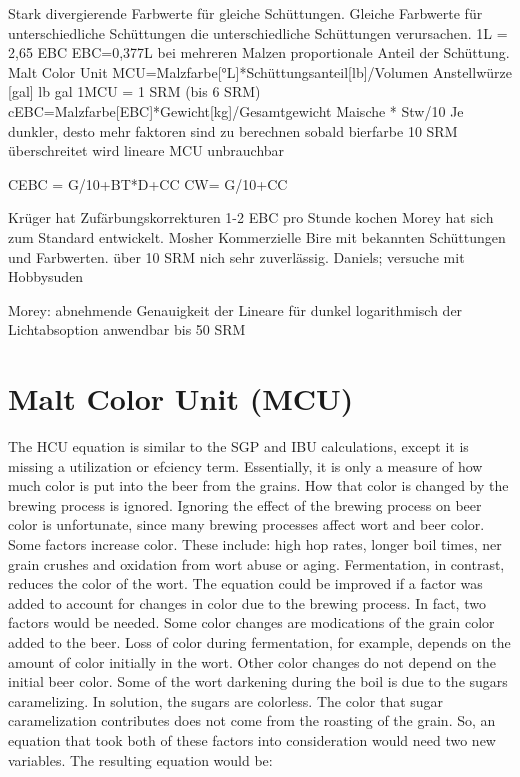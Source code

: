 \documentclass[a4paper,parskip=half]{scrartcl}
\begin{document}
\parencite{KrausWeyermann2021b}
Stark divergierende Farbwerte für gleiche Schüttungen.
Gleiche Farbwerte für unterschiedliche Schüttungen die 
unterschiedliche Schüttungen verursachen.
1L = 2,65 EBC
EBC=0,377L
bei mehreren Malzen proportionale Anteil der Schüttung.
Malt Color Unit MCU=Malzfarbe[°L]*Schüttungsanteil[lb]/Volumen Anstellwürze [gal]
lb gal 
1MCU = 1 SRM (bis 6 SRM)
cEBC=Malzfarbe[EBC]*Gewicht[kg]/Gesamtgewicht Maische * Stw/10 
Je dunkler, desto mehr faktoren sind zu berechnen
sobald bierfarbe 10 SRM überschreitet wird lineare MCU unbrauchbar

CEBC = G/10+BT*D+CC
CW= G/10+CC

Krüger hat Zufärbungskorrekturen
1-2 EBC pro Stunde kochen
Morey hat sich zum Standard entwickelt.
Mosher Kommerzielle Bire mit bekannten Schüttungen und Farbwerten. über 10 SRM nich sehr zuverlässig.
Daniels; versuche mit Hobbysuden

Morey: abnehmende Genauigkeit der Lineare für dunkel logarithmisch der Lichtabsoption
anwendbar bis 50 SRM

\section*{Malt Color Unit (MCU)}

\parencite{Colby2000}
The HCU equation is similar to the SGP and IBU calculations, except it is missing a utilization or efciency term.
Essentially, it is only a measure of how much color is put into the beer from the grains. How that color is
changed by the brewing process is ignored.
Ignoring the effect of the brewing process on beer color is unfortunate, since many brewing processes affect
wort and beer color. Some factors increase color. These include: high hop rates, longer boil times, ner grain
crushes and oxidation from wort abuse or aging. Fermentation, in contrast, reduces the color of the wort.
The equation could be improved if a factor was added to account for changes in color due to the brewing
process. In fact, two factors would be needed. Some color changes are modications of the grain color added to
the beer. Loss of color during fermentation, for example, depends on the amount of color initially in the wort.
Other color changes do not depend on the initial beer color. Some of the wort darkening during the boil is due
to the sugars caramelizing. In solution, the sugars are colorless. The color that sugar caramelization contributes
does not come from the roasting of the grain.
So, an equation that took both of these factors into consideration would need two new variables. The resulting
equation would be:
\end{document}
